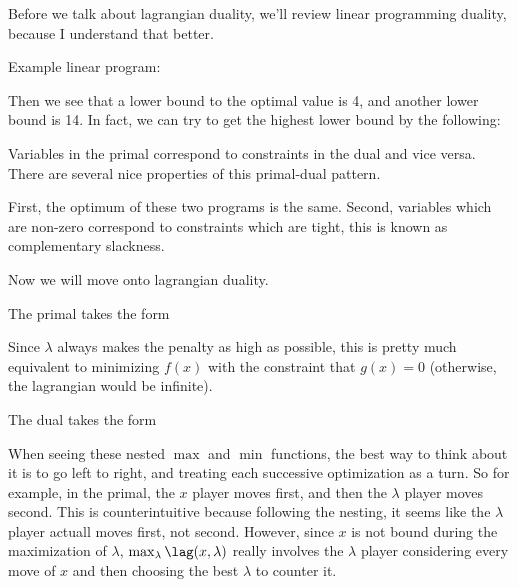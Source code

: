 \documentclass[12pt]{article}
\begin{document}
Before we talk about lagrangian duality, we'll review linear programming duality, because I understand that better.

Example linear program:


Then we see that a lower bound to the optimal value is 4, and another lower bound is 14. In fact, we can try to get the highest lower bound by the following:


Variables in the primal correspond to constraints in the dual and vice versa. There are several nice properties of this primal-dual pattern.

First, the optimum of these two programs is the same. Second, variables which are non-zero correspond to constraints which are tight, this is known as complementary slackness. 

Now we will move onto lagrangian duality.

The primal takes the form


Since $\lambda$ always makes the penalty as high as possible, this is pretty much equivalent to minimizing $f(x)$ with the constraint that $g(x) = 0$ (otherwise, the lagrangian would be infinite).

The dual takes the form


When seeing these nested $\max$ and $\min$ functions, the best way to think about it is to go left to right, and treating each successive optimization as a turn. So for example, in the primal, the $x$ player moves first, and then the $\lambda$ player moves second. This is counterintuitive because following the nesting, it seems like the $\lambda$ player actuall moves first, not second. However, since $x$ is not bound during the maximization of $\lambda$, $\max_\lambda \lag(x, \lambda)$ really involves the $\lambda$ player considering every move of $x$ and then choosing the best $\lambda$ to counter it.
\end{document}
